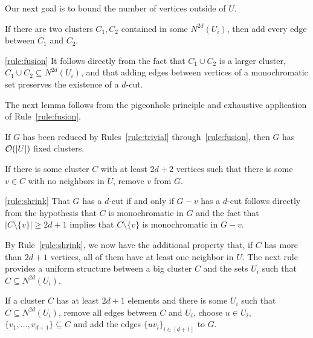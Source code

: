 Our next goal is to bound the number of vertices outside of $U$.

\begin{rrule}
    \label{rule:fusion}
    If there are two clusters $C_1, C_2$ contained in some $N^{2d}(U_i)$, then add every edge between $C_1$ and $C_2$.
\end{rrule}

\begin{sproof}{\ref{rule:fusion}}
    It follows directly from the fact that $C_1 \cup C_2$ is a larger cluster, $C_1 \cup C_2 \subseteq N^{2d}(U_i)$, and that adding edges between vertices of a monochromatic set preserves the existence of a $d$-cut.
\end{sproof}

The next lemma follows from the pigeonhole principle and exhaustive application of Rule~\ref{rule:fusion}.

\begin{lemma}
    \label{lem:fixed_clusters}
    If $G$ has been reduced by Rules~\ref{rule:trivial} through~\ref{rule:fusion}, then $G$ has $\mathcal{O}\!\left(|U|\right)$ fixed clusters.
\end{lemma}

\begin{rrule}
    \label{rule:shrink}
    If there is some cluster $C$ with at least $2d+2$ vertices such that there is some $v \in C$ with no neighbors in $U$, remove $v$ from $G$.
\end{rrule}

\begin{sproof}{\ref{rule:shrink}}
    That $G$ has a $d$-cut if and only if $G - v$ has a $d$-cut follows directly from the hypothesis that $C$ is monochromatic in $G$ and the fact that $|C \setminus \{v\}| \geq 2d + 1$ implies that $C \setminus \{v\}$ is monochromatic in $G - v$.
\end{sproof}

By Rule~\ref{rule:shrink}, we now have the additional property that, if $C$ has more than $2d+1$ vertices, all of them have at least one neighbor in $U$. The next rule provides a uniform structure between a big cluster $C$ and the sets $U_i$ such that $C \subseteq N^{2d}(U_i)$.

\begin{rrule}
    \label{rule:normalization1}
    If a cluster $C$ has at least $2d+1$ elements and there is some $U_i$ such that $C \subseteq N^{2d}(U_i)$, remove all edges between $C$ and $U_i$, choose $u \in U_i$, $\{v_1, \dots, v_{d+1}\} \subseteq C$ and add the edges $\{uv_i\}_{i \in [d+1]}$ to $G$.
\end{rrule}

